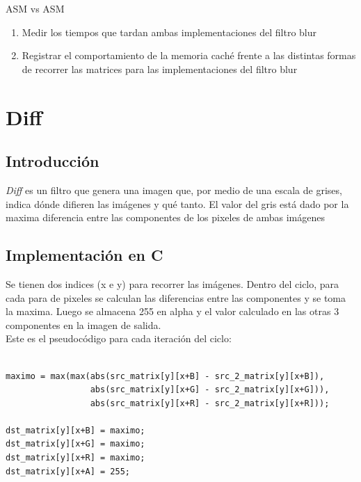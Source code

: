 \documentclass[10pt,a4paper,spanish]{article}
\begin{document}
ASM vs ASM

\begin{enumerate}
	\item Medir los tiempos que tardan ambas implementaciones del filtro blur
	\item Registrar el comportamiento de la memoria caché frente a las distintas formas de recorrer las matrices para las implementaciones del filtro blur
\end{enumerate}

\section{Diff}

\subsection{Introducción}

\textit{Diff} es un filtro que genera una imagen que, por medio de una escala de grises, indica dónde difieren las imágenes y qué tanto.
El valor del gris está dado por la maxima diferencia entre las componentes de los pixeles de ambas imágenes

\subsection{Implementación en C}

Se tienen dos indices (x e y) para recorrer las imágenes. Dentro del ciclo, para cada para de pixeles se calculan las diferencias entre las componentes y se toma la maxima. Luego se almacena 255 en alpha y el valor calculado en las otras 3 componentes en la imagen de salida. \\

Este es el pseudocódigo para cada iteración del ciclo:

\begin{codesnippet}
\begin{verbatim}

maximo = max(max(abs(src_matrix[y][x+B] - src_2_matrix[y][x+B]),
                 abs(src_matrix[y][x+G] - src_2_matrix[y][x+G])),
                 abs(src_matrix[y][x+R] - src_2_matrix[y][x+R]));

dst_matrix[y][x+B] = maximo;
dst_matrix[y][x+G] = maximo;
dst_matrix[y][x+R] = maximo;
dst_matrix[y][x+A] = 255;

\end{verbatim}
\end{codesnippet}
\end{document}
